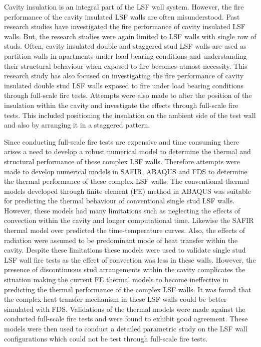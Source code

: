 {Cavity insulation is an integral part of the LSF wall system. However, the fire performance of the cavity insulated LSF walls are often misunderstood. Past research studies have investigated the fire performance of cavity insulated LSF walls. But, the research studies were again limited to LSF walls with single row of studs. Often, cavity insulated double and staggered stud LSF walls are used as partition walls in apartments under load bearing conditions and understanding their structural behaviour when exposed to fire becomes utmost necessity. This research study has also focused on investigating the fire performance of cavity insulated double stud LSF walls exposed to fire under load bearing conditions through full-scale fire tests. Attempts were also made to alter the position of the insulation within the cavity and investigate the effects through full-scale fire tests. This included positioning the insulation on the ambient side of the test wall and also by arranging it in a staggered pattern.

Since conducting full-scale fire tests are expensive and time consuming there arises a need to develop a robust numerical model to determine the thermal and structural performance of these complex LSF walls. Therefore attempts were made to develop numerical models in SAFIR, ABAQUS and FDS to determine the thermal performance of these complex LSF walls. The conventional thermal models developed through finite element (FE) method in ABAQUS was suitable for predicting the thermal behaviour of conventional single stud LSF walls. However, these models had many limitations such as neglecting the effects of convection within the cavity and longer computational time. Likewise the SAFIR thermal model over predicted the time-temperature curves. Also, the effects of radiation were assumed to be predominant mode of heat transfer within the cavity. Despite these limitations these models were used to validate single stud LSF wall fire tests as the effect of convection was less in these walls. However, the presence of discontinuous stud arrangements within the cavity complicates the situation making the current FE thermal models to become ineffective in predicting the thermal performance of the complex LSF walls. It was found that the complex heat transfer mechanism in these LSF walls could be better simulated with FDS. Validations of the thermal models were made against the conducted full-scale fire tests and were found to exhibit good agreement. These models were then used to conduct a detailed parametric study on the LSF wall configurations which could not be test through full-scale fire tests.

}
